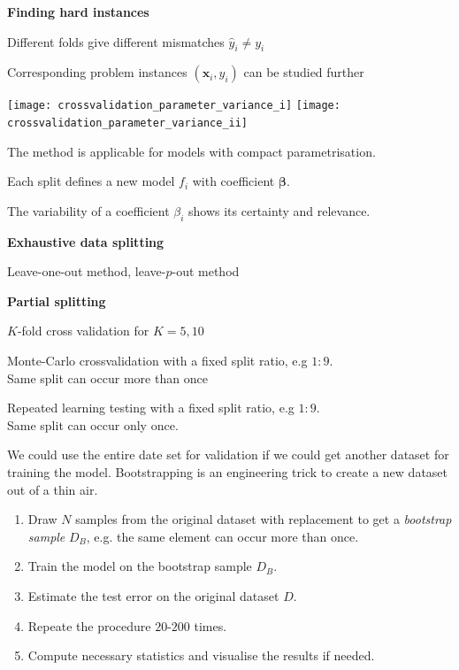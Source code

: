 \documentclass[landscape,footrule]{foils}
\renewcommand{\vec}[1]{\boldsymbol{#1}}
\begin{document}
\textbf{Finding hard instances}
\begin{triangles}
\item Different folds give different mismatches $\hat{y}_i\neq y_i$
\item Corresponding problem instances $(\vec{x}_i, y_i)$ can be studied further
\end{triangles}



\centerline{
\texttt{[image: crossvalidation\_parameter\_variance\_i]}\hspace*{0.5cm}
\texttt{[image: crossvalidation\_parameter\_variance\_ii]}}
\vspace*{-.5cm}
\begin{triangles}
\item The method is applicable for models with compact parametrisation.
\item Each split defines a new model $f_i$ with coefficient $\vec{\beta}$.   
\item The variability of a coefficient $\beta_i$ shows its certainty and relevance. 
\end{triangles}



\textbf{Exhaustive data splitting}
\begin{triangles}
\item Leave-one-out method, leave-$p$-out method
\end{triangles}
\vspace*{1cm}

\textbf{Partial splitting}
\begin{triangles}
\item $K$-fold cross validation for $K = 5 , 10$ 
\item Monte-Carlo crossvalidation with a fixed split ratio, e.g $1:9$.\\ Same split can occur more than once  
\item Repeated learning testing with  a fixed split ratio, e.g $1:9$.
\\ Same split can occur only once. 
\end{triangles}



We could use the entire date set for validation if we could get another dataset for training the model. Bootstrapping is an engineering trick to create a new dataset out of a thin air.
\begin{enumerate}
\item Draw $N$ samples from the original dataset with replacement to get a \emph{bootstrap sample} $D_{B}$, e.g. the same element can occur more than once.
\item Train the model  on the bootstrap sample $D_B$.
\item Estimate the test error on the original dataset $D$.
\item Repeate the procedure $20$-$200$ times.
\item Compute necessary statistics and visualise the results if needed.
\end{enumerate}
\end{document}
